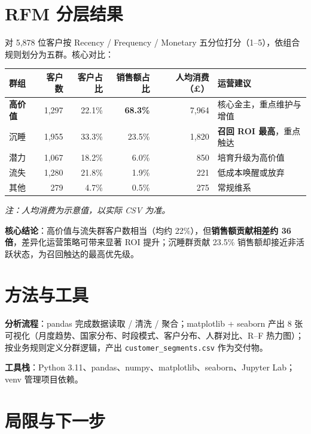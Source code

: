 \documentclass[10pt,a4paper,fontset=windows]{ctexart}
\begin{document}
\section*{RFM 分层结果}

对 5{,}878 位客户按 Recency / Frequency / Monetary 五分位打分（1--5），依组合规则划分为五群。核心对比：

\begin{center}
\renewcommand{\arraystretch}{1.15}
\begin{tabular}{@{}lrrrrl@{}}
    \toprule
    \textbf{群组} & \textbf{客户数} & \textbf{客户占比} & \textbf{销售额占比} & \textbf{人均消费（£）} & \textbf{运营建议} \\
    \midrule
    \color{accent}\textbf{高价值} & 1{,}297 & 22.1\% & \color{accent}\textbf{68.3\%} & 7{,}964 & 核心金主，重点维护与增值 \\
    沉睡 & 1{,}955 & 33.3\% & 23.5\% & 1{,}820 & \textbf{召回 ROI 最高}，重点触达 \\
    潜力 & 1{,}067 & 18.2\% & 6.0\% & 850 & 培育升级为高价值 \\
    流失 & 1{,}280 & 21.8\% & 1.9\% & 221 & 低成本唤醒或放弃 \\
    其他 & 279 & 4.7\% & 0.5\% & 275 & 常规维系 \\
    \bottomrule
\end{tabular}
\end{center}

\textit{\color{subcolor}注：人均消费为示意值，以实际 CSV 为准。}

\textbf{核心结论}：高价值与流失群客户数相当（均约 22\%），但\textbf{销售额贡献相差约 36 倍}，差异化运营策略可带来显著 ROI 提升；沉睡群贡献 23.5\% 销售额却接近非活跃状态，为召回触达的最高优先级。

\section*{方法与工具}

\textbf{分析流程}：pandas 完成数据读取 / 清洗 / 聚合；matplotlib + seaborn 产出 8 张可视化（月度趋势、国家分布、时段模式、客户分布、人群对比、R--F 热力图）；按业务规则定义分群逻辑，产出 \texttt{customer\_segments.csv} 作为交付物。

\textbf{工具栈}：Python 3.11、pandas、numpy、matplotlib、seaborn、Jupyter Lab；venv 管理项目依赖。

\section*{局限与下一步}
\end{document}
